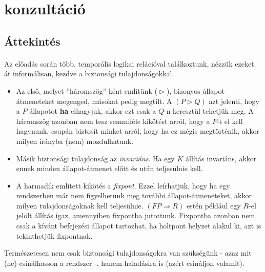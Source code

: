 \documentclass[12pt]{article}
\begin{document}
	\tableofcontents
	\newpage
	
	\section{konzultáció}
	\subsection{Áttekintés}
	\paragraph{}
	Az előadás során több, temporális logikai relációval találkoztunk, nézzük ezeket át informálisan, kezdve a biztonsági tulajdonságokkal.
	
	\begin{itemize}
		\item 
		Az első, melyet ''háromszög''-ként említünk ($ \vartriangleright $), bizonyos állapot-átmeneteket megenged, másokat pedig megtilt. A $(P \vartriangleright Q)$ azt jelenti, hogy a $P$ állapotot \textbf{ha} elhagyjuk, akkor ezt csak a $Q$-n keresztül tehetjük meg. A háromszög azonban nem tesz semmiféle kikötést arról, hogy a $P$-t el kell hagynunk, csupán biztosít minket arról, hogy ha ez mégis megtörténik, akkor milyen irányba (nem) mozdulhatunk.
		
		\item Másik biztonsági tulajdonság az \textit{invariáns}. Ha egy $K$ állítás invariáns, akkor ennek minden állapot-átmenet előtt és után teljesülnie kell.
		
		\item A harmadik említett kikötés a \textit{fixpont}. Ezzel leírhatjuk, hogy ha egy rendszerben már nem figyelhetünk meg további állapot-átmeneteket, akkor milyen tulajdonságoknak kell teljesülnie. $(FP \Rightarrow R)$ estén például egy $R$-el jelölt állítás igaz, amennyiben fixpontba jutottunk. Fixpontba azonban nem csak a kívánt befejezési állapot tartozhat, ha holtpont helyzet alakul ki, azt is tekinthetjük fixpontnak.
	\end{itemize}
	Természetesen nem csak biztonsági tulajdonságokra van szükségünk - azaz mit (ne) csinálhasson a rendszer -, hanem haladásira is (azért csináljon valamit).
	
\end{document}
